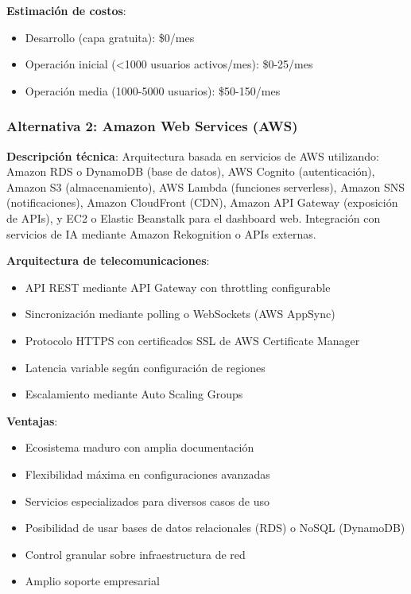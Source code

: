 \textbf{Estimación de costos}:
\begin{itemize}
    \item Desarrollo (capa gratuita): \$0/mes
    \item Operación inicial (<1000 usuarios activos/mes): \$0-25/mes
    \item Operación media (1000-5000 usuarios): \$50-150/mes
\end{itemize}

\subsubsection{Alternativa 2: Amazon Web Services (AWS)}

\textbf{Descripción técnica}: Arquitectura basada en servicios de AWS utilizando: Amazon RDS o DynamoDB (base de datos), AWS Cognito (autenticación), Amazon S3 (almacenamiento), AWS Lambda (funciones serverless), Amazon SNS (notificaciones), Amazon CloudFront (CDN), Amazon API Gateway (exposición de APIs), y EC2 o Elastic Beanstalk para el dashboard web. Integración con servicios de IA mediante Amazon Rekognition o APIs externas.


\textbf{Arquitectura de telecomunicaciones}:
\begin{itemize}
    \item API REST mediante API Gateway con throttling configurable
    \item Sincronización mediante polling o WebSockets (AWS AppSync)
    \item Protocolo HTTPS con certificados SSL de AWS Certificate Manager
    \item Latencia variable según configuración de regiones
    \item Escalamiento mediante Auto Scaling Groups
\end{itemize}

\textbf{Ventajas}:
\begin{itemize}
    \item Ecosistema maduro con amplia documentación
    \item Flexibilidad máxima en configuraciones avanzadas
    \item Servicios especializados para diversos casos de uso
    \item Posibilidad de usar bases de datos relacionales (RDS) o NoSQL (DynamoDB)
    \item Control granular sobre infraestructura de red
    \item Amplio soporte empresarial
\end{itemize}

